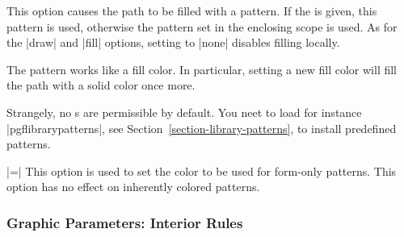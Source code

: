 \begin{itemize}
  This option causes the path to be filled with a pattern. If the
   is given, this pattern is used, otherwise the pattern
  set in the enclosing scope is used. As for the |draw| and |fill|
  options, setting  to |none| disables filling locally.

  The pattern works like a fill color. In particular, setting a new
  fill color will fill the path with a solid color once more.

  Strangely, no s are permissible by default. You neet to
  load for instance |pgflibrarypatterns|, see
  Section~\ref{section-library-patterns}, to install predefined
  patterns.  
  
\begin{codeexample}[]
\end{codeexample}

  |=|
  This option is used to set the color to be used for form-only
  patterns. This option has no effect on inherently colored patterns. 
  
\begin{codeexample}[]
\end{codeexample}

\begin{codeexample}[]
\end{codeexample}
\end{itemize}


\subsubsection{Graphic Parameters: Interior Rules}

